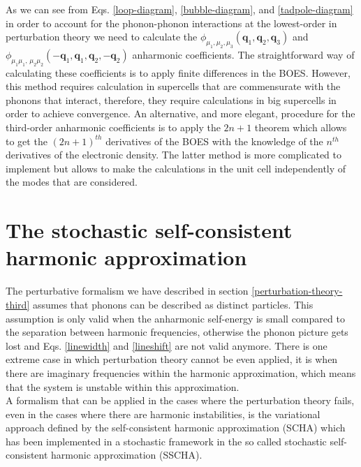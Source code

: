 As we can see from Eqs. \ref{loop-diagram}, \ref{bubble-diagram}, and \ref{tadpole-diagram} in order to account for the phonon-phonon interactions at the lowest-order in perturbation theory we need to calculate 
the $\phi_{\mu_{1},\mu_{2},\mu_{3}}(\mathbf{q}_{1},\mathbf{q}_{2},\mathbf{q}_{3})$ and $\phi_{\mu_{1}\mu_{1},\,\mu_{2}\mu_{2}}(-\mathbf{q}_{1},\mathbf{q}_{1},\mathbf{q}_{2},-\mathbf{q}_{2})$ anharmonic coefficients.   
The straightforward way of calculating these coefficients is to apply finite differences in the BOES\cite{li2014shengbte}. However, this method requires calculation in supercells that are commensurate with the 
phonons that interact, therefore, they require calculations in big supercells in order to achieve convergence. An alternative, and more elegant, procedure for the third-order anharmonic coefficients is to apply 
the $2n+1$ theorem\cite{gonze1989density} which allows to get the $(2n+1)^{th}$ derivatives of the BOES with the knowledge of the $n^{th}$ derivatives of the electronic density. The latter method is more complicated 
to implement\cite{paulatto2013anharmonic} but allows to make the calculations in the unit cell independently of the modes that are considered.  

\section{The stochastic self-consistent harmonic approximation}
\label{sscha-basics}

The perturbative formalism we have described in section \ref{perturbation-theory-third} assumes that phonons can be described as distinct particles. This assumption is only valid when the anharmonic self-energy is 
small compared to the separation between harmonic frequencies, otherwise the phonon picture gets lost and Eqs. \ref{linewidth} and \ref{lineshift} are not valid anymore. There is one extreme case in which perturbation 
theory cannot be even applied, it is when there are imaginary frequencies within the harmonic approximation, which means that the system is unstable within this approximation. \\

A formalism that can be applied in the cases where the perturbation theory fails, even in the cases where there are harmonic instabilities, is the variational approach defined by the self-consistent harmonic 
approximation (SCHA)\cite{hooton1955li} which has been implemented in a stochastic framework in the so called stochastic self-consistent harmonic approximation (SSCHA)\cite{errea2014anharmonic,errea2013first}. \\ 

